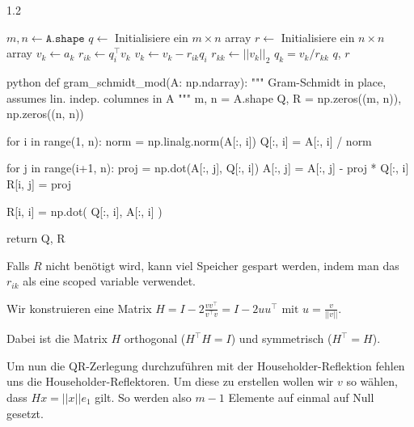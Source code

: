 \drmvspace
\begin{algorithm}
    \begin{spacing}{1.2}
        \caption{\textsc{modifiedGramSchmidt}(A)}
        \begin{algorithmic}[1]
            \State $m, n \gets \texttt{A.shape}$
            \State $q \gets$ Initialisiere ein $m \times n$ array
            \State $r \gets$ Initialisiere ein $n \times n$ array
                \State $v_k \gets a_k$ 
                    \State $r_{ik} \gets q_i^\top v_k$
                    \State $v_k \gets v_k - r_{ik} q_i$
                \EndFor
                \State $r_{kk} \gets ||v_k||_2$
                \State $q_k = v_k / r_{kk}$ 
            \EndFor
            \State \Return $q$, $r$
        \end{algorithmic}
    \end{spacing}
\end{algorithm}
\begin{code}{python}
def gram_schmidt_mod(A: np.ndarray):
    """ Gram-Schmidt in place, assumes lin. indep. columnes in A  """
    m, n = A.shape
    Q, R = np.zeros((m, n)), np.zeros((n, n))
    
    for i in range(1, n):
        norm = np.linalg.norm(A[:, i])
        Q[:, i] = A[:, i] / norm
        
        for j in range(i+1, n):
            proj = np.dot(A[:, j], Q[:, i])
            A[:, j] = A[:, j] - proj * Q[:, i]
            R[i, j] = proj
        
        R[i, i] = np.dot( Q[:, i], A[:, i] )
    
    return Q, R  
\end{code}

Falls $R$ nicht benötigt wird, kann viel Speicher gespart werden, indem man das $r_{ik}$ als eine scoped variable verwendet.


\newpage
{}

Wir konstruieren eine Matrix $H = I - 2 \displaystyle\frac{vv^\top}{v^\top v} = I - 2uu^\top \text{ mit } u = \frac{v}{||v||}$.

Dabei ist die Matrix $H$ orthogonal ($H^\top H = I$) und symmetrisch ($H^\top = H$).

Um nun die QR-Zerlegung durchzuführen mit der Householder-Reflektion fehlen uns die Householder-Reflektoren.
Um diese zu erstellen wollen wir $v$ so wählen, dass $Hx = ||x|| e_1$ gilt. So werden also $m - 1$ Elemente auf einmal auf Null gesetzt.

